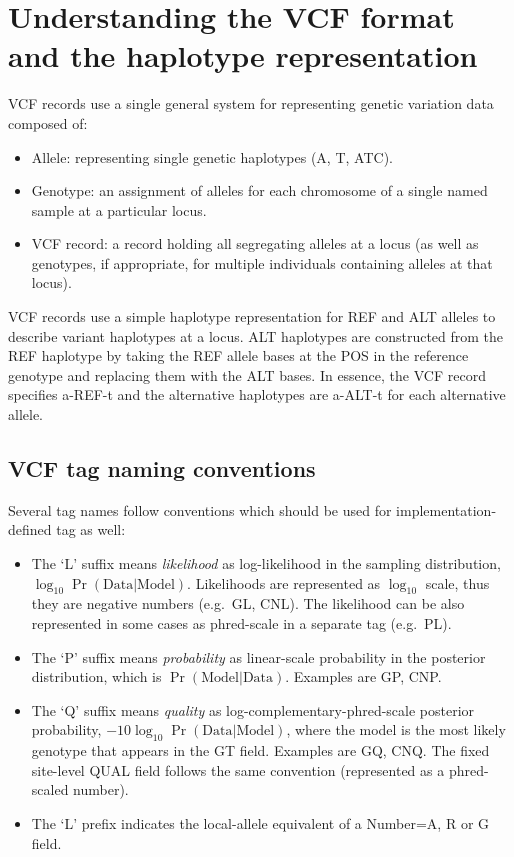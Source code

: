\documentclass[8pt]{article}
\begin{document}
\section{Understanding the VCF format and the haplotype representation}
VCF records use a single general system for representing genetic variation data composed of:
\begin{itemize}
  \item Allele: representing single genetic haplotypes (A, T, ATC).
  \item Genotype: an assignment of alleles for each chromosome of a single named sample at a particular locus.
  \item VCF record: a record holding all segregating alleles at a locus (as well as genotypes, if appropriate, for multiple individuals containing alleles at that locus).
\end{itemize}
VCF records use a simple haplotype representation for REF and ALT alleles to describe variant haplotypes at a locus.
ALT haplotypes are constructed from the REF haplotype by taking the REF allele bases at the POS in the reference genotype and replacing them with the ALT bases.
In essence, the VCF record specifies a-REF-t and the alternative haplotypes are a-ALT-t for each alternative allele.

\subsection{VCF tag naming conventions}
Several tag names follow conventions which should be used for implementation-defined tag as well:
\begin{itemize}
    \item The `L' suffix means \emph{likelihood} as log-likelihood in the sampling distribution, $\log_{10} \Pr(\mathrm{Data}|\mathrm{Model})$.
    Likelihoods are represented as $\log_{10}$ scale, thus they are negative numbers (e.g.\ GL, CNL).
    The likelihood can be also represented in some cases as phred-scale in a separate tag (e.g.\ PL).

    \item The `P' suffix means \emph{probability} as linear-scale probability in the posterior distribution, which is $\Pr(\mathrm{Model}|\mathrm{Data})$. Examples are GP, CNP.

    \item The `Q' suffix means \emph{quality} as log-complementary-phred-scale posterior probability, $-10 \log_{10} \Pr(\mathrm{Data}|\mathrm{Model})$, where the model is the most likely genotype that appears in the GT field.
    Examples are GQ, CNQ.
    The fixed site-level QUAL field follows the same convention (represented as a phred-scaled number).
    
	\item The `L' prefix indicates the local-allele equivalent of a Number=A, R or G field.
\end{itemize}
\end{document}
